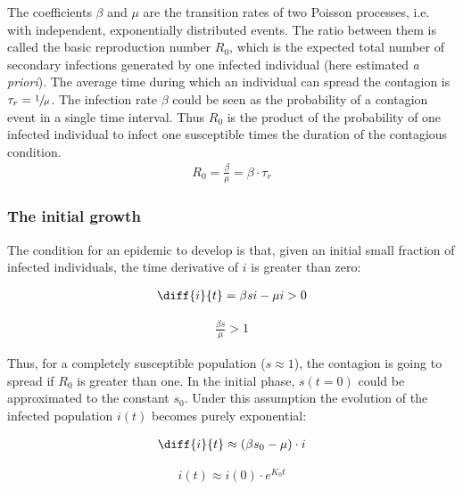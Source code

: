 \documentclass[DIV=12, BCOR=0pt]{scrartcl}  %
\begin{document}
  The coefficients $\beta$ and $\mu$ are the transition rates of two Poisson processes, i.e. with independent, exponentially distributed events. The ratio between them is called the basic reproduction number $R_0$, which is the expected total number of secondary infections generated by one infected individual (here estimated \textit{a priori}).   
  The average time during which an individual can spread the contagion is $\tau_{r} = \sfrac{1}{\mu}$. The infection rate $\beta$ could be seen as the probability of a contagion event in a single time interval. Thus $R_0$ is the product of the probability of one infected individual to infect one susceptible times the duration of the contagious condition.
  \begin{align}
			R_0 = \frac{\beta}{\mu} = \beta \cdot \tau_{r}
			\label{eq:R0}
  \end{align}

  \subsubsection{The initial growth}
  The condition for an epidemic to develop is that, given an initial small fraction of infected individuals, the time derivative of $i$ is greater than zero:
  
  \begin{align}
  	\diff{i}{t} = \beta s i - \mu i > 0 
  	\label{sir_growthCond}
  \end{align}

  \begin{align} %
  	\frac{\beta s}{\mu} > 1  %
  	\label{eq:sir_growthReq}
  \end{align}
  
  Thus, for a completely susceptible population ($s \approx 1$), the contagion is going to spread if $R_0$ is greater than one. In the initial phase, $s(t=0)$ could be approximated to the constant $s_0$.
  Under this assumption the evolution of the infected population $i(t)$ becomes purely exponential:
  
  \begin{align}
  	\diff{i}{t} \approx  (\beta s_0 - \mu) \cdot i 
  	\label{eq:sir_approxi}
  \end{align}

  \begin{align} %
  	i(t) \approx i(0) \cdot e^{K_0 t} 
  	\label{eq:sir_growthK0}
  \end{align}
\end{document}
